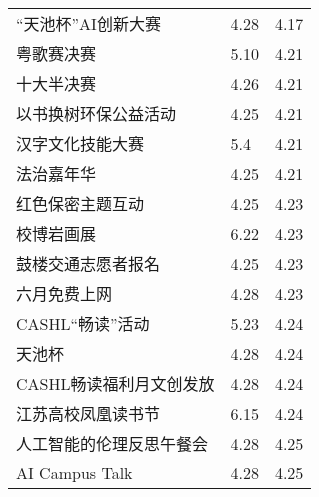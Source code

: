 \documentclass[letterpaper, 12pt]{article}
\begin{document}
\begin{multicols}{2}
{\begin{longtable}{|>{\centering\arraybackslash}m{}|m{}|m{}|}
    “天池杯”AI创新大赛 & 4.28 & 4.17\\
    粤歌赛决赛 & 5.10 & 4.21\\
    十大半决赛 & 4.26 & 4.21\\
    以书换树环保公益活动 & 4.25 & 4.21\\
    汉字文化技能大赛 & 5.4 & 4.21\\ 
    法治嘉年华 & 4.25 & 4.21\\
    红色保密主题互动 & 4.25 & 4.23\\
    校博岩画展 & 6.22 & 4.23\\
    鼓楼交通志愿者报名 & 4.25 & 4.23\\
    六月免费上网 & 4.28 & 4.23\\
    CASHL“畅读”活动 & 5.23 & 4.24\\
    天池杯 & 4.28 & 4.24\\
    CASHL畅读福利月文创发放 & 4.28 & 4.24\\
    江苏高校凤凰读书节 & 6.15 & 4.24\\
    人工智能的伦理反思午餐会 & 4.28 & 4.25\\
    AI Campus Talk & 4.28 & 4.25\\
    
    \hline
\end{longtable}
\unskip
\unpenalty
\unpenalty}\unvbox\colbbox
\end{multicols}
\end{document}
